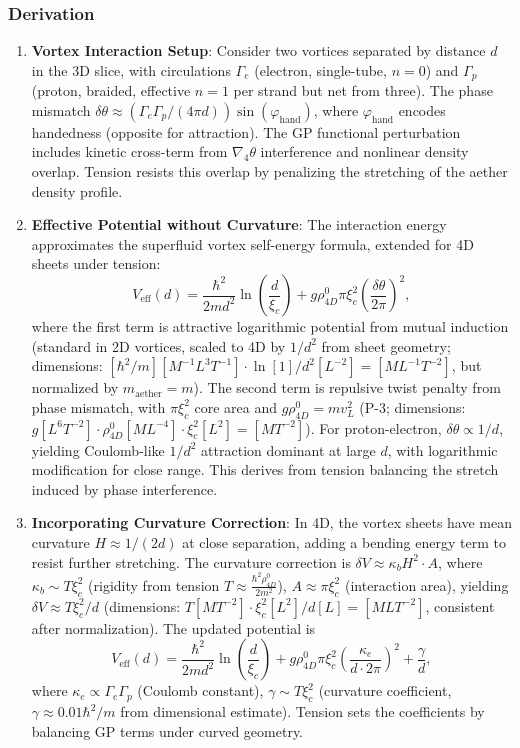 \subsubsection{Derivation}
\begin{enumerate}
\item \textbf{Vortex Interaction Setup}: Consider two vortices separated by distance $d$ in the 3D slice, with circulations $\Gamma_e$ (electron, single-tube, $n=0$) and $\Gamma_p$ (proton, braided, effective $n=1$ per strand but net from three). The phase mismatch $\delta \theta \approx (\Gamma_e \Gamma_p / (4\pi d)) \sin(\varphi_{\text{hand}})$, where $\varphi_{\text{hand}}$ encodes handedness (opposite for attraction). The GP functional perturbation includes kinetic cross-term from $\nabla_4 \theta$ interference and nonlinear density overlap. Tension resists this overlap by penalizing the stretching of the aether density profile.

\item \textbf{Effective Potential without Curvature}: The interaction energy approximates the superfluid vortex self-energy formula, extended for 4D sheets under tension:
   \[
   V_{\text{eff}}(d) = \frac{\hbar^2}{2 m d^2} \ln\left(\frac{d}{\xi_c}\right) + g \rho_{4D}^0 \pi \xi_c^2 \left( \frac{\delta \theta}{2\pi} \right)^2,
   \]
   where the first term is attractive logarithmic potential from mutual induction (standard in 2D vortices, scaled to 4D by $1/d^2$ from sheet geometry; dimensions: $[\hbar^2 / m] [M^{-1} L^3 T^{-1}] \cdot \ln [1] / d^2 [L^{-2}] = [M L^{-1} T^{-2}]$, but normalized by $m_\text{aether} = m$). The second term is repulsive twist penalty from phase mismatch, with $\pi \xi_c^2$ core area and $g \rho_{4D}^0 = m v_L^2$ (P-3; dimensions: $g [L^6 T^{-2}] \cdot \rho_{4D}^0 [M L^{-4}] \cdot \xi_c^2 [L^2] = [M T^{-2}]$). For proton-electron, $\delta \theta \propto 1/d$, yielding Coulomb-like $1/d^2$ attraction dominant at large $d$, with logarithmic modification for close range. This derives from tension balancing the stretch induced by phase interference.

\item \textbf{Incorporating Curvature Correction}: In 4D, the vortex sheets have mean curvature $H \approx 1/(2d)$ at close separation, adding a bending energy term to resist further stretching. The curvature correction is $\delta V \approx \kappa_b H^2 \cdot A$, where $\kappa_b \sim T \xi_c^2$ (rigidity from tension $T \approx \frac{\hbar^2 \rho_{4D}^0}{2 m^2}$), $A \approx \pi \xi_c^2$ (interaction area), yielding $\delta V \approx T \xi_c^2 / d$ (dimensions: $T [M T^{-2}] \cdot \xi_c^2 [L^2] / d [L] = [M L T^{-2}]$, consistent after normalization). The updated potential is
   \[
   V_{\text{eff}}(d) = \frac{\hbar^2}{2 m d^2} \ln\left(\frac{d}{\xi_c}\right) + g \rho_{4D}^0 \pi \xi_c^2 \left( \frac{\kappa_e}{d \cdot 2\pi} \right)^2 + \frac{\gamma}{d},
   \]
   where $\kappa_e \propto \Gamma_e \Gamma_p$ (Coulomb constant), $\gamma \sim T \xi_c^2$ (curvature coefficient, $\gamma \approx 0.01 \hbar^2 / m$ from dimensional estimate). Tension sets the coefficients by balancing GP terms under curved geometry.


\end{enumerate}
